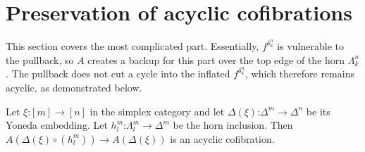 \documentclass{tac}
\newcommand\hide[1]{}
\newcommand\of{\mathord:}
\newcommand\simplex[1]{\Delta^{#1}}
\newcommand\horn[2]{\Lambda^{#1}_{#2}}
\newcommand\Y{\Delta}
\begin{document}
\hide{
  has right adjoint (which hence preserves fibrations)
  which is right inverse of reindexing
}
\section{Preservation of acyclic cofibrations}
This section covers the most complicated part.
Essentially, \( f^{\delta^n_k} \) is vulnerable to the pullback, 
so \( A \) creates a backup for this part over the top edge of 
the horn \( \horn{n}{k} \). The pullback does not
cut a cycle into the inflated \( f^{\delta^n_k} \), which
therefore remains acyclic, as demonstrated below.

\begin{lemma}
  Let \(\xi\of[m]\to[n]\) in the simplex category and let \(
    \Y(\xi)\of \simplex{m} \to \simplex{n} \) be its Yoneda embedding.
  Let \(h^m_l \of \horn{m}{l}\to\simplex{m}\) be the
  horn inclusion. Then \( A(\Y(\xi)\circ(h^m_l))\to A(\Y(\xi)) \) is an acyclic
  cofibration.
\end{lemma}
\end{document}

